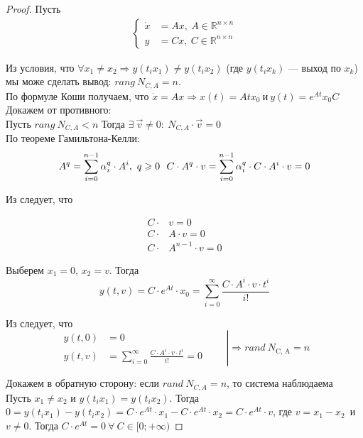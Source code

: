 \documentclass[../../TAU.tex]{subfiles}
\begin{document}
    \begin{proof}
        Пусть
        \begin{align*}
            \begin{cases}
                \dot x &= Ax,\ A\in\mathbb{R}^{n\times n} \\
                y &= Cx,\ C\in\mathbb{R}^{n\times n}
            \end{cases}
        \end{align*}

        Из условия, что 
        $
            \forall x_1\neq x_2 \Rightarrow y(t_ix_1) \neq y(t_ix_2)
        $
        (где $y(t_ix_k)$ --- выход по $x_k$) мы може сделать вывод:
        $rang\ N_{C, A}=n$.\\
        По формуле Коши получаем, что 
        $
            \dot x = Ax \Rightarrow x(t) = Atx_0\ \text{и}\ y(t)= e^{At}x_0C
        $\\
        Докажем от противного:\\
        Пусть $rang\ N_{C, A}<n$ Тогда $\exists\ \vec v\neq0:\ N_{C,A}\cdot\vec v = 0$\\
        По теореме Гамильтона-Келли:
        \begin{equation}
            A^q=\sum_{i=0}^{n-1}\alpha_i^q\cdot A^i,\ q\geqslant 0\ \ C\cdot A^q\cdot v=\sum_{i=0}^{n-1}\alpha_i^q\cdot C \cdot A^i \cdot v = 0 
            \label{EQ21}
        \end{equation}

        Из  следует, что
        
        \begin{align*}
            C\cdot& v = 0 \\
            C\cdot& A \cdot v = 0 \\
            C\cdot& A^{n-1}\cdot v = 0
        \end{align*}


        Выберем $x_1=0$, $x_2=v$. Тогда
        \begin{equation}
            y(t,v)=C\cdot e^{At}\cdot x_0 = \sum_{i=0}^\infty\frac{C\cdot A^i\cdot v\cdot t^i}{i!}
            \label{EQ21_1}
        \end{equation}

        Из  следует, что
        \begin{equation*}
        \left.
            \begin{aligned}
                y(t,0)&=0 \\
                y(t,v)&=\sum_{i=0}^\infty\frac{C\cdot A^i\cdot v\cdot t^i}{i!}=0
            \end{aligned}
        \qquad \right|\Rightarrow rand\ N_\text{C, A}=n
        \end{equation*}

        Докажем в обратную сторону: если $rand\ N_{C, A}=n$, то система наблюдаема\\
        Пусть $x_1\neq x_2$ и $y(t_ix_1)=y(t_ix_2)$.
        Тогда $0=y(t_ix_1)-y(t_ix_2)=C\cdot e^{At}\cdot x_1-C\cdot e^{At}\cdot x_2=C\cdot e^{At}\cdot v$, где $v=x_1-x_2$\ и $v\neq 0$. Тогда $C\cdot e^{At} = 0\ \forall\ C\in [0; +\infty)$
    \end{proof}
\end{document}
